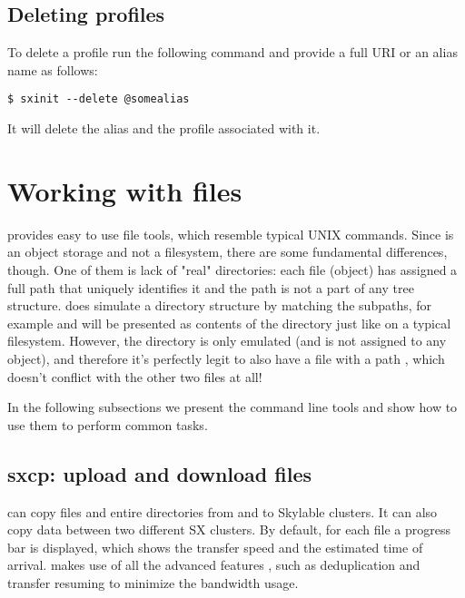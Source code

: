 \subsection{Deleting profiles}
To delete a profile run the following command and provide a full URI
or an alias name as follows:
\begin{lstlisting}
$ sxinit --delete @somealias
\end{lstlisting}
It will delete the alias  and the profile associated with
it.

\section{Working with files} \label{sec:files}
\SX provides easy to use file tools, which resemble typical UNIX commands.
Since \SX is an object storage and not a filesystem, there are some
fundamental differences, though. One of them is lack of "real" directories:
each file (object) has assigned a full path that uniquely identifies it and
the path is not a part of any tree structure. \SX does simulate a directory
structure by matching the subpaths, for example 
and  will be presented as contents of the directory
 just like on a typical filesystem. However, the directory
 is only emulated (and is not assigned to any object), and
therefore it's perfectly legit to also have a file with a path ,
which doesn't conflict with the other two files at all! 

In the following subsections we present the command line tools and show
how to use them to perform common tasks.

\subsection{sxcp: upload and download files}
 can copy files and entire directories from and to Skylable \SX
clusters. It can also copy data between two different SX clusters. By default,
for each file a progress bar is displayed, which shows the transfer speed and
the estimated time of arrival.  makes use of all the advanced features \SX,
such as deduplication and transfer resuming to minimize the bandwidth usage.

